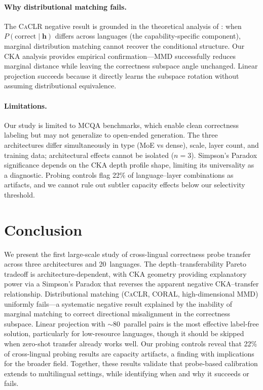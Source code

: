 \documentclass[11pt,a4paper]{article}
\newcommand{\caclr}{\textsc{CaCLR}}
\newcommand{\cka}{\textsc{CKA}}
\begin{document}
\paragraph{Why distributional matching fails.}
The \caclr{} negative result is grounded in the theoretical analysis of \citet{zhao2019learning}: when $P(\text{correct} \mid \mathbf{h})$ differs across languages (the capability-specific component), marginal distribution matching cannot recover the conditional structure. Our \cka{} analysis provides empirical confirmation---MMD successfully reduces marginal distance while leaving the correctness subspace angle unchanged. Linear projection succeeds because it directly learns the subspace rotation without assuming distributional equivalence.

\paragraph{Limitations.}
Our study is limited to MCQA benchmarks, which enable clean correctness labeling but may not generalize to open-ended generation. The three architectures differ simultaneously in type (MoE vs dense), scale, layer count, and training data; architectural effects cannot be isolated ($n=3$). Simpson's Paradox significance depends on the \cka{} depth profile shape, limiting its universality as a diagnostic. Probing controls flag 22\% of language--layer combinations as artifacts, and we cannot rule out subtler capacity effects below our selectivity threshold.

\section{Conclusion}

We present the first large-scale study of cross-lingual correctness probe transfer across three architectures and 20~languages. The depth--transferability Pareto tradeoff is architecture-dependent, with \cka{} geometry providing explanatory power via a Simpson's Paradox that reverses the apparent negative CKA--transfer relationship. Distributional matching (\caclr{}, CORAL, high-dimensional MMD) uniformly fails---a systematic negative result explained by the inability of marginal matching to correct directional misalignment in the correctness subspace. Linear projection with ${\sim}80$~parallel pairs is the most effective label-free solution, particularly for low-resource languages, though it should be skipped when zero-shot transfer already works well. Our probing controls reveal that 22\% of cross-lingual probing results are capacity artifacts, a finding with implications for the broader field. Together, these results validate that probe-based calibration extends to multilingual settings, while identifying when and why it succeeds or fails.
\end{document}
